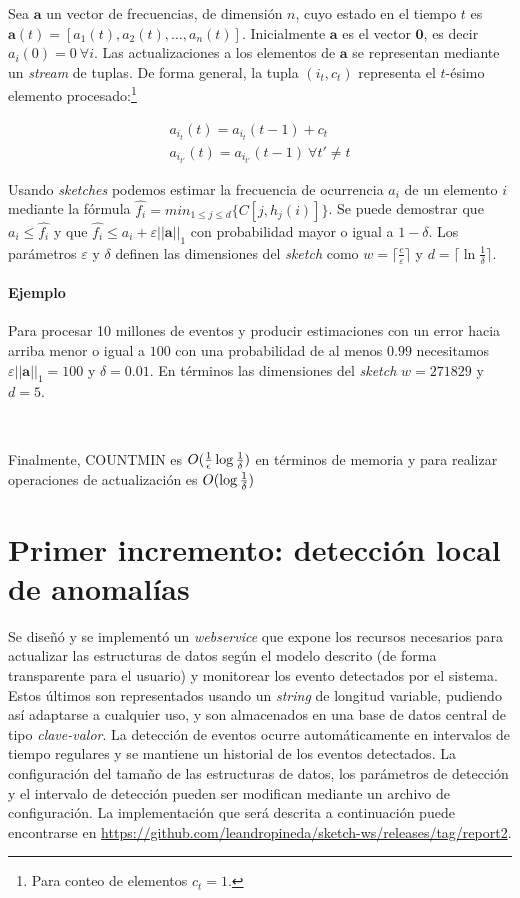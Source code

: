 \documentclass[a4paper,10pt, oneside]{article}
\begin{document}
Sea $\mathbf{a}$ un vector de frecuencias, de dimensión $n$, cuyo estado en el tiempo $t$ es $\mathbf{a}(t)=[a_1(t), a_2(t), \dots, a_n(t)]$. Inicialmente $\mathbf{a}$ es el vector $\mathbf{0}$, es decir $a_i(0)=0 \ \forall i$. Las actualizaciones a los elementos de $\mathbf{a}$ se representan mediante un \textit{stream} de tuplas. De forma general, la tupla $(i_t, c_t)$ representa el $t$-ésimo elemento procesado:\footnote{Para conteo de elementos $c_t=1$.}

\begin{gather*}
a_{i_t}(t)=a_{i_t}(t-1) + c_t\\
a_{i_{t'}}(t)=a_{i_{t'}}(t-1) \ \forall t' \neq t 
\end{gather*}

Usando \textit{sketches} podemos estimar la frecuencia de ocurrencia $a_i$ de un elemento $i$ mediante la fórmula $\hat{f_i} = min_{1 \leq j \leq d}\{C[j,h_j(i)]\}$. Se puede demostrar que $a_i \leq \hat{f_i}$ y que $\hat{f_i} \leq a_i + \varepsilon ||\mathbf{a}||_1$ con probabilidad mayor o igual a $1-\delta$. Los parámetros $\varepsilon$ y $\delta$ definen las dimensiones del \textit{sketch} como $w=\lceil \frac{e}{\varepsilon}\rceil$ y $d=\lceil \ln \frac{1}{\delta} \rceil$.

\paragraph{Ejemplo} Para procesar 10 millones de eventos y producir estimaciones con un error hacia arriba menor o igual a $100$ con una probabilidad de al menos $0.99$ necesitamos $\varepsilon ||\mathbf{a}||_1=100$ y $\delta = 0.01$. En términos las dimensiones del \textit{sketch} $w=271829$ y $d=5$.

\

Finalmente, COUNTMIN es $O({1 \over \epsilon} \log {1 \over \delta})$ en términos de memoria y para realizar operaciones de actualización es $O(\log {1 \over \delta})$

\section{Primer incremento: detección local de anomalías}
Se diseñó y se implementó un \textit{webservice} que expone los recursos necesarios para actualizar las estructuras de datos según el modelo descrito (de forma transparente para el usuario) y monitorear los evento detectados por el sistema. Estos últimos son representados usando un \textit{string} de longitud variable, pudiendo así adaptarse a cualquier uso, y son almacenados en una base de datos central de tipo \textit{clave-valor}. La detección de eventos ocurre automáticamente en intervalos de tiempo regulares y se mantiene un historial de los eventos detectados. La configuración del tamaño de las estructuras de datos, los parámetros de detección y el intervalo de detección pueden ser modifican mediante un archivo de configuración.
La implementación que será descrita a continuación puede encontrarse en  \url{https://github.com/leandropineda/sketch-ws/releases/tag/report2}.
\end{document}
